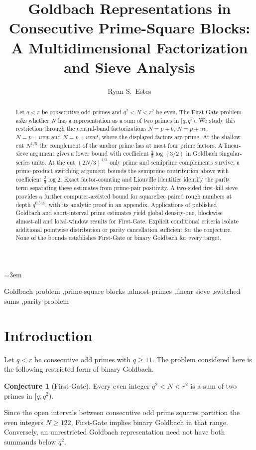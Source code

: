 \documentclass[final,11pt]{elsarticle}
\theoremstyle{definition}
\newtheorem{conjecture}[theorem]{Conjecture}
\theoremstyle{remark}
\numberwithin{equation}{section}
\begin{document}
\emergencystretch=3em
\begin{frontmatter}
\title{Goldbach Representations in Consecutive Prime-Square Blocks:\\
A Multidimensional Factorization and Sieve Analysis}
\author[inst1]{Ryan S.~Estes}
\begin{abstract}
Let $q<r$ be consecutive odd primes and $q^2<N<r^2$ be even. The First-Gate problem asks whether $N$ has a representation as a sum of two primes in $[q,q^2)$. We study this restriction through the central-band factorizations
$N=p+b$, $N=p+uv$, $N=p+uvw$ and $N=p+uvwt$, where the displayed factors are prime. At the shallow cut $N^{1/5}$ the complement of the anchor prime has at most four prime factors. A linear-sieve argument gives a lower bound with coefficient $\frac23\log(3/2)$ in Goldbach singular-series units. At the cut $(2N/3)^{1/3}$ only prime and semiprime complements survive; a prime-product switching argument bounds the semiprime contribution above with coefficient $\frac23\log2$. Exact factor-counting and Liouville identities identify the parity term separating these estimates from prime-pair positivity. A two-sided first-kill sieve provides a further computer-assisted bound for squarefree paired rough numbers at depth $q^{0.548}$, with its analytic proof in an appendix. Applications of published Goldbach and short-interval prime estimates yield global density-one, blockwise almost-all and local-window results for First-Gate. Explicit conditional criteria isolate additional pointwise distribution or parity cancellation sufficient for the conjecture. None of the bounds establishes First-Gate or binary Goldbach for every target.
\end{abstract}
\begin{keyword}
Goldbach problem \sep prime-square blocks \sep almost-primes \sep linear sieve \sep switched sums \sep parity problem
\end{keyword}
\end{frontmatter}

\section{Introduction}\label{sec:introduction}
Let $q<r$ be consecutive odd primes with $q\ge11$. The problem considered here is the following restricted form of binary Goldbach.
\begin{conjecture}[First-Gate]\label{conj:fg}
Every even integer $q^2<N<r^2$ is a sum of two primes in $[q,q^2)$.
\end{conjecture}
Since the open intervals between consecutive odd prime squares partition the even integers $N\ge122$, First-Gate implies binary Goldbach in that range. Conversely, an unrestricted Goldbach representation need not have both summands below $q^2$.
\end{document}
